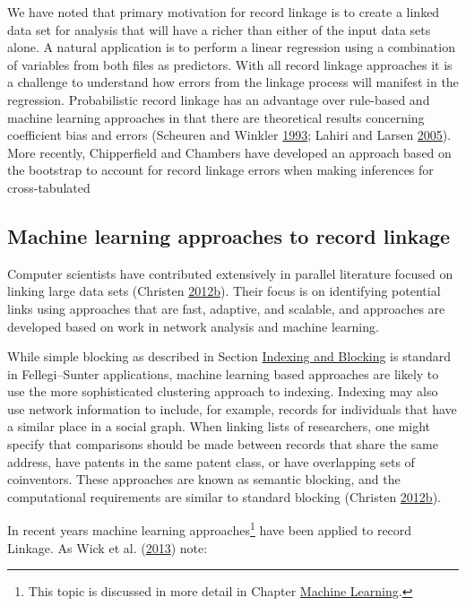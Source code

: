 \documentclass[]{krantz}
\begin{document}
We have noted that primary motivation for record linkage is to create a
linked data set for analysis that will have a richer than either of the
input data sets alone. A natural application is to perform a linear
regression using a combination of variables from both files as
predictors. With all record linkage approaches it is a challenge to
understand how errors from the linkage process will manifest in the
regression. Probabilistic record linkage has an advantage over
rule-based and machine learning approaches in that there are theoretical
results concerning coefficient bias and errors (Scheuren and Winkler
\protect\hyperlink{ref-scheuren1993regression}{1993}; Lahiri and Larsen
\protect\hyperlink{ref-lahiri2005regression}{2005}). More recently,
Chipperfield and Chambers have developed an approach based on the
bootstrap to account for record linkage errors when making inferences
for cross-tabulated

\subsection{Machine learning approaches to record
linkage}\label{machine-learning-approaches-to-record-linkage}

Computer scientists have contributed extensively in parallel literature
focused on linking large data sets (Christen
\protect\hyperlink{ref-christen2012data}{2012}\protect\hyperlink{ref-christen2012data}{b}).
Their focus is on identifying potential links using approaches that are
fast, adaptive, and scalable, and approaches are developed based on work
in network analysis and machine learning.

While simple blocking as described in Section
\protect\hyperlink{S:indexing}{Indexing and Blocking} is standard in
Fellegi--Sunter applications, machine learning based approaches are
likely to use the more sophisticated clustering approach to indexing.
Indexing may also use network information to include, for example,
records for individuals that have a similar place in a social graph.
When linking lists of researchers, one might specify that comparisons
should be made between records that share the same address, have patents
in the same patent class, or have overlapping sets of coinventors. These
approaches are known as semantic blocking, and the computational
requirements are similar to standard blocking (Christen
\protect\hyperlink{ref-christen2012data}{2012}\protect\hyperlink{ref-christen2012data}{b}).

In recent years machine learning approaches\footnote{This topic is
  discussed in more detail in Chapter
  \protect\hyperlink{chap:ml}{Machine Learning}.} have been applied to
record Linkage. As Wick et al.
(\protect\hyperlink{ref-wick2013joint}{2013}) note:
\end{document}
